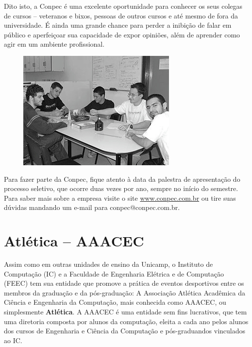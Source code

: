 Dito isto, a Conpec é uma excelente oportunidade para conhecer os seus colegas
de cursos -- veteranos e bixos, pessoas de outros cursos e até mesmo de fora da
universidade. É ainda uma grande chance para perder a inibição de falar em
público e aperfeiçoar sua capacidade de expor opiniões, além de aprender como
agir em um ambiente profissional.
\begin{figure}[h!]
    \vspace{-10pt}
    \centering
    \includegraphics[scale=0.75, keepaspectratio=true]{img/imgs/19-conpec/-101.jpg}
    \vspace{-10pt}
\end{figure}

Para fazer parte da Conpec, fique atento à data da palestra de apresentação do
processo seletivo, que ocorre duas vezes por ano, sempre no início do semestre.
Para saber mais sobre a empresa visite o site \url{www.conpec.com.br} ou
tire suas dúvidas mandando um e-mail para conpec@conpec.com.br.

\section{Atlética -- AAACEC}

Assim como em outras unidades de ensino da Unicamp, o Instituto de Computação
(IC) e a Faculdade de Engenharia Elétrica e de Computação (FEEC) tem sua
entidade que promove a prática de eventos desportivos entre os membros da
graduação e da pós-graduação: A Associação Atlética Acadêmica da Ciência
e Engenharia da Computação, mais conhecida como AAACEC, ou simplesmente
\textbf{Atlética}. A AAACEC é uma entidade sem fins lucrativos, que tem uma
diretoria composta por alunos da computação, eleita a cada ano pelos alunos
dos cursos de Engenharia e Ciência da Computação e pós-graduandos vinculados ao IC.


